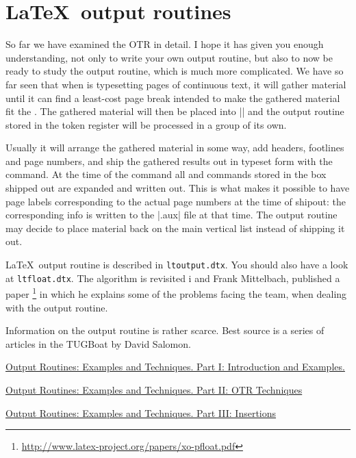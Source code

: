 \section{\LaTeX\  output routines}

So far we have examined the \tex OTR in detail. I hope it has given you enough understanding, not only to write your own output routine, but also to now be ready to study the \latex output routine, which is much more complicated. We have so far seen that  when \tex 
is typesetting pages of continuous text, it will gather material until it can find a least-cost page break intended to
make the gathered material fit the . The
gathered material will then be placed into || and
the output routine stored in the token register 
will be processed in a group of its own. 

Usually it will
arrange the gathered material in some way, add headers,
footlines and page numbers, and ship the gathered results out in typeset form with the  command.
At the time of the  command all  and
 commands stored in the box shipped out are expanded and written out. This is what makes it possible to have page labels corresponding to the actual page
numbers at the time of shipout: the corresponding info
is written to the |.aux| file at that time.
The output routine may decide to place material
back on the main vertical list instead of shipping it out.

\LaTeX\ output routine is described in \texttt{ltoutput.dtx}. You should also have a look at \texttt{ltfloat.dtx}. The algorithm is revisited i  and Frank Mittelbach, published a paper
\footnote{\protect\url{http://www.latex-project.org/papers/xo-pfloat.pdf}} in which he explains some of the problems facing the team, when dealing with the output routine.


Information on the output routine is rather scarce. Best source is a series of  articles in the TUGBoat by David Salomon.

\href{http://www.tug.org/TUGboat/Articles/tb11-1/tb27salomon.pdf}{Output Routines: Examples and Techniques. Part I: Introduction and Examples.}

\href{http://www.tug.org/TUGboat/Articles/tb11-2/tb28salomon.pdf}{Output Routines: Examples and Techniques. Part II: OTR Techniques}

\href{http://www.tug.org/TUGboat/Articles/tb11-4/tb30salomon.pdf}{Output Routines: Examples and Techniques. 
Part III: Insertions}

